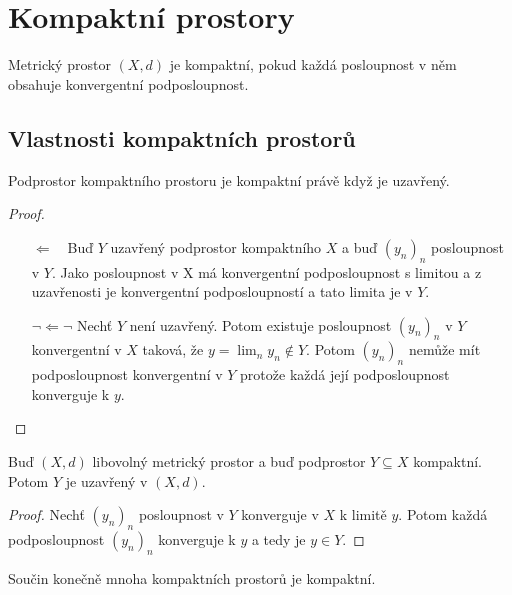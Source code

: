 \documentclass[../main.tex]{subfiles}
\begin{document}
\section{Kompaktní prostory}

\begin{definition}
	Metrický prostor $(X,d)$ je kompaktní, pokud každá posloupnost v něm obsahuje konvergentní podposloupnost.
\end{definition}

\subsection{Vlastnosti kompaktních prostorů}

\begin{lemma}
	Podprostor kompaktního prostoru je kompaktní právě když je uzavřený.
\end{lemma}

\begin{proof}
	\begin{enumerate}
	    \item[$\Leftarrow \phantom{\lnot} $] Buď $Y$ uzavřený podprostor kompaktního $X$ a buď $(y_n)_n$ posloupnost v $Y$. Jako posloupnost v X má 
	    konvergentní podposloupnost s limitou a z uzavřenosti je konvergentní podposloupností a tato limita je v $Y$.
	    \item[$\lnot \Leftarrow \lnot $] Nechť $Y$ není uzavřený. Potom existuje posloupnost $(y_n)_n$ v $Y$ konvergentní v $X$ taková, že $y = \lim_n y_n \notin Y$. Potom $(y_n)_n$
	    nemůže mít podposloupnost konvergentní v $Y$ protože každá její podposloupnost konverguje k $y$.
	\end{enumerate}
\end{proof}

\begin{lemma} \label{ch:komp=>uz}
	Buď $(X,d)$ libovolný metrický prostor a
	buď podprostor $Y \subseteq X$ kompaktní. Potom $Y$ je uzavřený v $(X,d)$.
\end{lemma}

\begin{proof}
	Nechť $(y_n)_n$ posloupnost v $Y$ konverguje v $X$ k limitě $y$. Potom každá podposloupnost $(y_n)_n$ konverguje k 
	$y$ a tedy je $y \in Y$.
\end{proof}

\begin{theorem}
	Součin konečně mnoha kompaktních prostorů je kompaktní.
\end{theorem}
\end{document}
